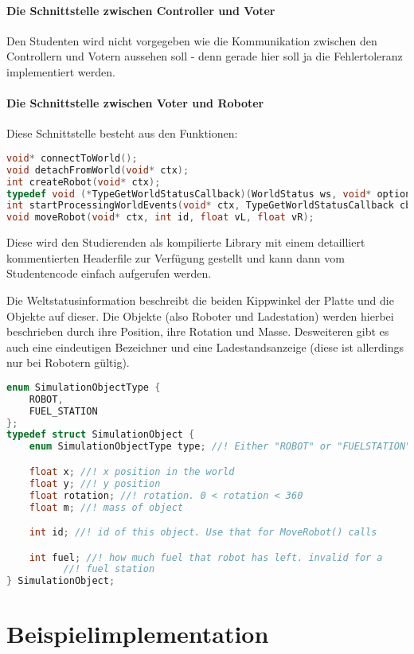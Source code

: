 \paragraph{Die Schnittstelle zwischen Controller und Voter} Den Studenten wird nicht vorgegeben wie die Kommunikation zwischen den Controllern und Votern aussehen soll - denn gerade hier soll ja die Fehlertoleranz implementiert werden.

\paragraph{Die Schnittstelle zwischen Voter und Roboter} Diese Schnittstelle besteht aus den Funktionen:
\begin{lstlisting}[frame=single, language=c] 
void* connectToWorld();
void detachFromWorld(void* ctx);
int createRobot(void* ctx);
typedef void (*TypeGetWorldStatusCallback)(WorldStatus ws, void* optional);
int startProcessingWorldEvents(void* ctx, TypeGetWorldStatusCallback cb, void* optional);
void moveRobot(void* ctx, int id, float vL, float vR);
\end{lstlisting}

Diese wird den Studierenden als kompilierte Library mit einem detailliert kommentierten Headerfile zur Verf{\"{u}}gung gestellt und kann
dann vom Studentencode einfach aufgerufen werden.

Die Weltstatusinformation beschreibt die beiden Kippwinkel der Platte und die Objekte auf dieser. Die Objekte (also Roboter und Ladestation) werden hierbei beschrieben
durch ihre Position, ihre Rotation und Masse. Desweiteren gibt es auch eine eindeutigen Bezeichner und eine Ladestandsanzeige (diese ist allerdings nur bei Robotern
g{\"{u}}ltig).
\label{worldstatus} 
\begin{lstlisting}[frame=single, language=c]
enum SimulationObjectType {
	ROBOT,
	FUEL_STATION
};
typedef struct SimulationObject {
	enum SimulationObjectType type; //! Either "ROBOT" or "FUELSTATION"

	float x; //! x position in the world
	float y; //! y position
	float rotation; //! rotation. 0 < rotation < 360
	float m; //! mass of object

	int id; //! id of this object. Use that for MoveRobot() calls

	int fuel; //! how much fuel that robot has left. invalid for a
		  //! fuel station
} SimulationObject;
\end{lstlisting}

\clearpage
\section{Beispielimplementation}

